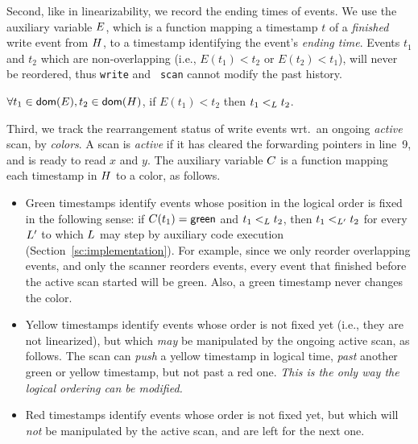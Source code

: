 Second, like in linearizability, we record the ending times of
events. We use the auxiliary variable $E$, which is a function
mapping a timestamp $t$ of a \emph{finished} write event from $H$,
to a timestamp identifying the event's \emph{ending time}. Events
$t_1$ and $t_2$ which are non-overlapping (i.e., $E(t_1) < t_2$ or
$E(t_2) < t_1$), will never be reordered, thus {\tt write} and {\tt
  scan} cannot modify the past history.


\begin{proposition}\label{inv:overlap}%
$\forall t_1 \in \mathsf{dom}(E), t_2 \in \mathsf{dom}(H)$, if $E(t_1) < t_2$
  then $t_1 \mathrel{<_L} t_2$.
\end{proposition}

Third, we track the rearrangement status of write events wrt.~an
ongoing \emph{active} scan, by \emph{colors}. A scan is \emph{active}
if it has cleared the forwarding pointers in line~9, and is ready to
read $x$ and $y$. The auxiliary variable $C$ is a function mapping
each timestamp in $H$ to a color, as follows.
%
%
\begin{itemize}
\item {\sf Green} timestamps identify events whose position in the
  logical order is fixed in the following sense: if $C(t_1) =
  \mathsf{green}$ and $t_1 \mathrel{<_L} t_2$, then $t_1 <_{L'} t_2$ for
  every $L'$ to which $L$ may step by auxiliary code
  execution (Section~\ref{sc:implementation}). For example, since we
  only reorder overlapping events, and only the scanner reorders
  events, every event that finished before the active scan started
  will be green. Also, a green timestamp never changes the color.
\item {\sf Yellow} timestamps identify events whose order is not fixed
  yet (i.e., they are not linearized), but which \emph{may} be
  manipulated by the ongoing active scan, as follows.  The scan can
  \emph{push} a yellow timestamp in logical time, \emph{past} another
  green or yellow timestamp, but not past a red one. \emph{This is the
    only way the logical ordering can be modified.}

\item {\sf Red} timestamps identify events whose order is not fixed
  yet, but which will \emph{not} be manipulated by the active scan,
  and are left for the next one.
%
\end{itemize}
%

